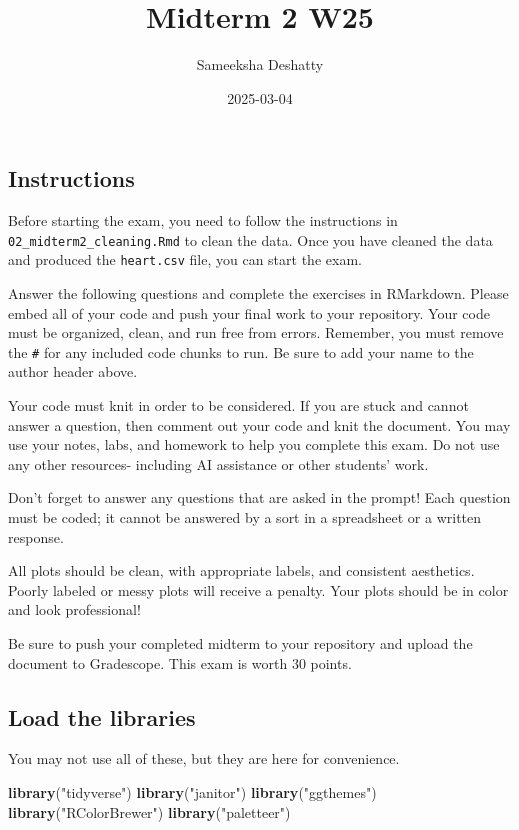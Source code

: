 \documentclass[
]{article}
\title{Midterm 2 W25}
\author{Sameeksha Deshatty}
\date{2025-03-04}
\newenvironment{Shaded}{\begin{snugshade}}{\end{snugshade}}
\newcommand{\FunctionTok}[1]{\textcolor[rgb]{0.13,0.29,0.53}{\textbf{#1}}}
\newcommand{\NormalTok}[1]{#1}
\newcommand{\StringTok}[1]{\textcolor[rgb]{0.31,0.60,0.02}{#1}}
\begin{document}
\maketitle

\subsection{Instructions}\label{instructions}

Before starting the exam, you need to follow the instructions in
\texttt{02\_midterm2\_cleaning.Rmd} to clean the data. Once you have
cleaned the data and produced the \texttt{heart.csv} file, you can start
the exam.

Answer the following questions and complete the exercises in RMarkdown.
Please embed all of your code and push your final work to your
repository. Your code must be organized, clean, and run free from
errors. Remember, you must remove the \texttt{\#} for any included code
chunks to run. Be sure to add your name to the author header above.

Your code must knit in order to be considered. If you are stuck and
cannot answer a question, then comment out your code and knit the
document. You may use your notes, labs, and homework to help you
complete this exam. Do not use any other resources- including AI
assistance or other students' work.

Don't forget to answer any questions that are asked in the prompt! Each
question must be coded; it cannot be answered by a sort in a spreadsheet
or a written response.

All plots should be clean, with appropriate labels, and consistent
aesthetics. Poorly labeled or messy plots will receive a penalty. Your
plots should be in color and look professional!

Be sure to push your completed midterm to your repository and upload the
document to Gradescope. This exam is worth 30 points.

\subsection{Load the libraries}\label{load-the-libraries}

You may not use all of these, but they are here for convenience.

\begin{Shaded}
\begin{Highlighting}[]
\FunctionTok{library}\NormalTok{(}\StringTok{"tidyverse"}\NormalTok{)}
\FunctionTok{library}\NormalTok{(}\StringTok{"janitor"}\NormalTok{)}
\FunctionTok{library}\NormalTok{(}\StringTok{"ggthemes"}\NormalTok{)}
\FunctionTok{library}\NormalTok{(}\StringTok{"RColorBrewer"}\NormalTok{)}
\FunctionTok{library}\NormalTok{(}\StringTok{"paletteer"}\NormalTok{)}
\end{Highlighting}
\end{Shaded}
\end{document}
